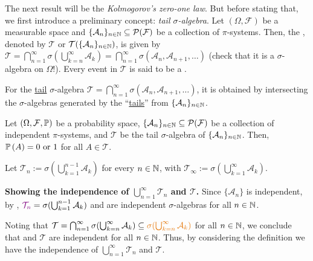 \begin{enumerate}
The next result will be the \emph{Kolmogorov's zero-one law}. But before
stating that, we first introduce a preliminary concept: \emph{tail
\(\sigma\)-algebra}. Let \((\Omega,\mathcal{F})\) be a measurable space and
\(\{\mathcal{A}_n\}_{n\in\mathbb{N}}\subseteq \mathcal{P}(\mathcal{F})\) be a
collection of \(\pi\)-systems. Then, the  , denoted by \(\mathcal{T}\) or
\(\mathcal{T}(\{\mathcal{A}_n\}_{n\in\mathbb{N}})\), is given by
\(\mathcal{T}=\bigcap_{n=1}^{\infty}\sigma(\bigcup_{k=n}^{\infty}\mathcal{A}_k)
=\bigcap_{n=1}^{\infty}\sigma(\mathcal{A}_n,\mathcal{A}_{n+1},\dotsc)\) (check
that it is a \(\sigma\)-algebra on \(\Omega\)!). Every event in \(\mathcal{T}\)
is said to be a .
\begin{intuition}
For the \underline{tail} \(\sigma\)-algebra
\(\mathcal{T}=\bigcap_{n=1}^{\infty}\sigma(\mathcal{A}_n,\mathcal{A}_{n+1},\dotsc)\),
it is obtained by intersecting the \(\sigma\)-algebras generated by the
``\underline{tails}'' from \(\{\mathcal{A}_n\}_{n\in\mathbb{N}}\).
\end{intuition}
\begin{theorem}
\label{thm:kolmogorov-zero-one}
Let \((\Omega,\mathcal{F},\mathbb{P})\) be a probability space,
\(\{\mathcal{A}_n\}_{n\in\mathbb{N}}\subseteq \mathcal{P}(\mathcal{F})\) be a
collection of independent \(\pi\)-systems, and \(\mathcal{T}\) be the tail
\(\sigma\)-algebra of \(\{\mathcal{A}_n\}_{n\in\mathbb{N}}\). Then,
\(\mathbb{P}\left(A\right)=0\text{ or }1\) for all \(A\in\mathcal{T}\).
\end{theorem}
\begin{pf}
Let \(\mathcal{T}_n:=\sigma(\bigcup_{k=1}^{n-1}\mathcal{A}_k)\) for every \(n\in\mathbb{N}\), with
\(\mathcal{T}_{\infty}:=\sigma(\bigcup_{k=1}^{\infty}\mathcal{A}_k)\).

\textbf{Showing the independence of \(\bigcup_{n=1}^{\infty}\mathcal{T}_n\) and \(\mathcal{T}\).}
Since \(\{\mathcal{A}_{n}\}\) is independent, by ,
\(\vc{\mathcal{T}_n}=\sigma(\bigcup_{k=1}^{n-1}\mathcal{A}_k)\) and
 are independent
\(\sigma\)-algebras for all \(n\in\mathbb{N}\).

Noting that \(\mathcal{T}=\bigcap_{n=1}^{\infty}\sigma(\bigcup_{k=n}^{\infty}\mathcal{A}_k)
\subseteq\orc{\sigma(\bigcup_{k=n}^{\infty}\mathcal{A}_k)}\) for all \(n\in\mathbb{N}\),
we conclude that  and \(\mathcal{T}\) are independent for all \(n\in\mathbb{N}\).
Thus, by considering the definition we have the independence of
\(\bigcup_{n=1}^{\infty}\mathcal{T}_n\) and \(\mathcal{T}\).


\end{pf}
\end{enumerate}
